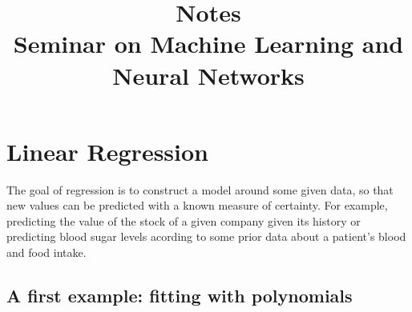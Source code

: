 \documentclass{report}
\title{Notes \\ Seminar on Machine Learning and Neural Networks}
\date{}
\author{}
\begin{document}
\maketitle




\chapter{Linear Regression}


The goal of regression is to construct a model around some given data, so that new values can be predicted with a known measure of certainty. For example, predicting the value of the stock of a given company given its history or predicting blood sugar levels acording to some prior data about a patient's blood and food intake.

\section{A first example: fitting with polynomials}
\end{document}
